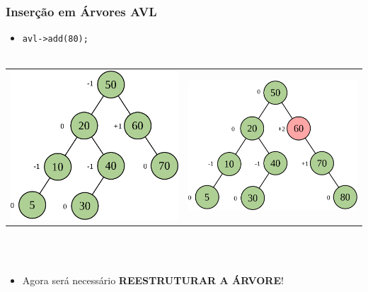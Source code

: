 \documentclass[aspectratio=169]{beamer}
\begin{document}
\begin{frame}[fragile]\frametitle{Inserção em Árvores AVL}
\begin{itemize}
	\item \texttt{avl->add(80);}\\~
\end{itemize}
\begin{tabular}{p{}p{}}
\includegraphics[height=0.5\paperheight]{imagens/avl11c.png} &
\includegraphics[height=0.5\paperheight]{imagens/avl12c.png} \\
\end{tabular}
\\~
\begin{itemize}
	\item Agora será necessário \textbf{REESTRUTURAR A ÁRVORE}!
\end{itemize}
\end{frame}
\end{document}
